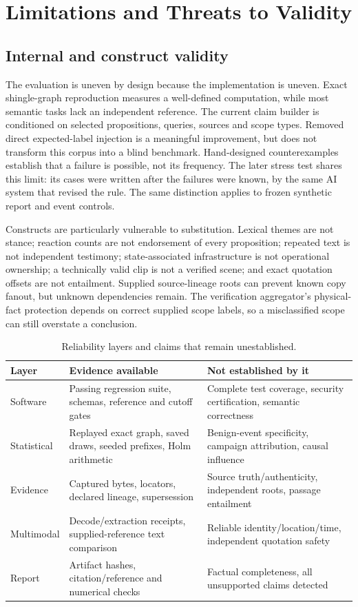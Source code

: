\section{Limitations and Threats to Validity}
\subsection{Internal and construct validity}
The evaluation is uneven by design because the implementation is uneven. Exact shingle-graph reproduction measures a well-defined computation, while most semantic tasks lack an independent reference. The current claim builder is conditioned on selected propositions, queries, sources and scope types. Removed direct expected-label injection is a meaningful improvement, but does not transform this corpus into a blind benchmark. Hand-designed counterexamples establish that a failure is possible, not its frequency. The later stress test shares this limit: its cases were written after the failures were known, by the same AI system that revised the rule. The same distinction applies to frozen synthetic report and event controls.

Constructs are particularly vulnerable to substitution. Lexical themes are not stance; reaction counts are not endorsement of every proposition; repeated text is not independent testimony; state-associated infrastructure is not operational ownership; a technically valid clip is not a verified scene; and exact quotation offsets are not entailment. Supplied source-lineage roots can prevent known copy fanout, but unknown dependencies remain. The verification aggregator's physical-fact protection depends on correct supplied scope labels, so a misclassified scope can still overstate a conclusion.

\begin{table}[tbp]
\caption{Reliability layers and claims that remain unestablished.}
\label{tab:reliability}\small
\begin{tabularx}{\linewidth}{@{}p{27mm}X X@{}}\toprule
Layer & Evidence available & Not established by it\\\midrule
Software & Passing regression suite, schemas, reference and cutoff gates & Complete test coverage, security certification, semantic correctness\\
Statistical & Replayed exact graph, saved draws, seeded prefixes, Holm arithmetic & Benign-event specificity, campaign attribution, causal influence\\
Evidence & Captured bytes, locators, declared lineage, supersession & Source truth/authenticity, independent roots, passage entailment\\
Multimodal & Decode/extraction receipts, supplied-reference text comparison & Reliable identity/location/time, independent quotation safety\\
Report & Artifact hashes, citation/reference and numerical checks & Factual completeness, all unsupported claims detected\\\bottomrule
\end{tabularx}
\end{table}

